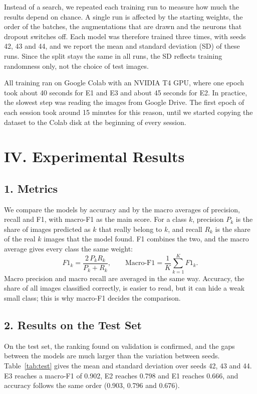 \documentclass{article}
\begin{document}
Instead of a search, we repeated each training run to measure how much the results depend on chance. A single run is affected by the starting weights, the order of the batches, the augmentations that are drawn and the neurons that dropout switches off. Each model was therefore trained three times, with seeds 42, 43 and 44, and we report the mean and standard deviation (SD) of these runs. Since the split stays the same in all runs, the SD reflects training randomness only, not the choice of test images.

All training ran on Google Colab with an NVIDIA T4 GPU, where one epoch took about 40 seconds for E1 and E3 and about 45 seconds for E2. In practice, the slowest step was reading the images from Google Drive. The first epoch of each session took around 15 minutes for this reason, until we started copying the dataset to the Colab disk at the beginning of every session.

\section{IV. Experimental Results}

\subsection{1. Metrics}

We compare the models by accuracy and by the macro averages of precision, recall and F1, with macro-F1 as the main score. For a class $k$, precision $P_k$ is the share of images predicted as $k$ that really belong to $k$, and recall $R_k$ is the share of the real $k$ images that the model found. F1 combines the two, and the macro average gives every class the same weight:
\begin{equation}
  F1_k = \frac{2\,P_k R_k}{P_k + R_k}, \qquad \text{Macro-F1} = \frac{1}{K}\sum_{k=1}^{K} F1_k .
\end{equation}
Macro precision and macro recall are averaged in the same way. Accuracy, the share of all images classified correctly, is easier to read, but it can hide a weak small class; this is why macro-F1 decides the comparison.

\subsection{2. Results on the Test Set}

On the test set, the ranking found on validation is confirmed, and the gaps between the models are much larger than the variation between seeds. Table~\ref{tab:test} gives the mean and standard deviation over seeds 42, 43 and 44. E3 reaches a macro-F1 of 0.902, E2 reaches 0.798 and E1 reaches 0.666, and accuracy follows the same order (0.903, 0.796 and 0.676).
\end{document}
